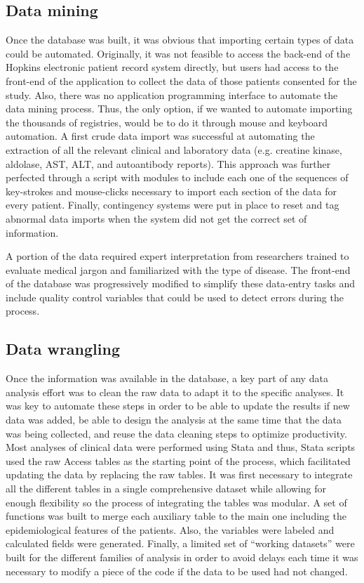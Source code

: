 \subsection{Data mining}
Once the database was built, it was obvious that importing certain types of data could be automated. Originally, it was not feasible to access the back-end of the Hopkins electronic patient record system directly, but users had access to the front-end of the application to collect the data of those patients consented for the study. Also, there was no application programming interface to automate the data mining process. Thus, the only option, if we wanted to automate importing the thousands of registries, would be to do it through mouse and keyboard automation. A first crude data import was successful at automating the extraction of all the relevant clinical and laboratory data (e.g. creatine kinase, aldolase, AST, ALT, and autoantibody reports). This approach was further perfected through a script with modules to include each one of the sequences of key-strokes and mouse-clicks necessary to import each section of the data for every patient. Finally, contingency systems were put in place to reset and tag abnormal data imports when the system did not get the correct set of information.

A portion of the data required expert interpretation from researchers trained to evaluate medical jargon and familiarized with the type of disease. The front-end of the database was progressively modified to simplify these data-entry tasks and include quality control variables that could be used to detect errors during the process.

\subsection{Data wrangling}
Once the information was available in the database, a key part of any data analysis effort was to clean the raw data to adapt it to the specific analyses. It was key to automate these steps in order to be able to update the results if new data was added, be able to design the analysis at the same time that the data was being collected, and reuse the data cleaning steps to optimize productivity. Most analyses of clinical data were performed using Stata and thus, Stata scripts used the raw Access tables as the starting point of the process, which facilitated updating the data by replacing the raw tables. It was first necessary to integrate all the different tables in a single comprehensive dataset while allowing for enough flexibility so the process of integrating the tables was modular. A set of functions was built to merge each auxiliary table to the main one including the epidemiological features of the patients. Also, the variables were labeled and calculated fields were generated. Finally, a limited set of “working datasets” were built for the different families of analysis in order to avoid delays each time it was necessary to modify a piece of the code if the data to be used had not changed.

